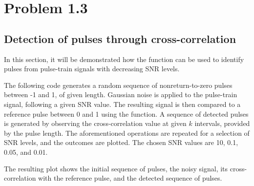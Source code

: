 \section{Problem 1.3}

\subsection{Detection of pulses through cross-correlation}
In this section, it will be demonstrated how the  function can be used to identify pulses from pulse-train signals with decreasing SNR levels.

The following code generates a random sequence of nonreturn-to-zero pulses between -1 and 1, of given length.
Gaussian noise is applied to the pulse-train signal, following a given SNR value.
The resulting signal is then compared to a reference pulse between 0 and 1 using the  function.
A sequence of detected pulses is generated by observing the cross-correlation value at given $k$ intervals, provided by the pulse length.
The aforementioned operations are repeated for a selection of SNR levels, and the outcomes are plotted.
The chosen SNR values are 10, 0.1, 0.05, and 0.01.

The resulting plot shows the initial sequence of pulses, the noisy signal, its cross-correlation with the reference pulse, and the detected sequence of pulses.

